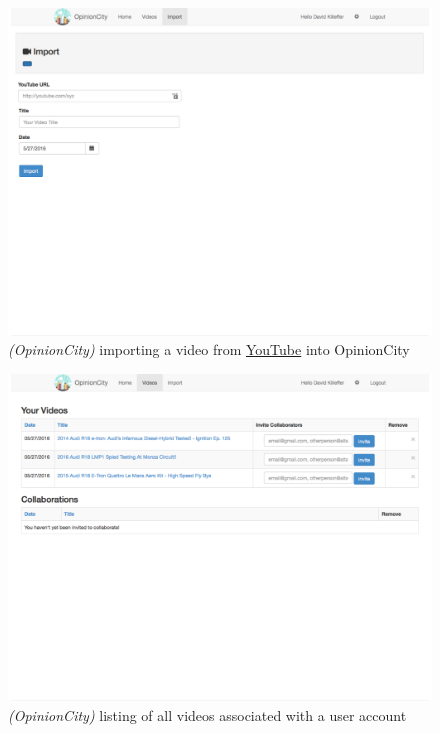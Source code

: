 \begin{figure}[!ht]
	\includegraphics[width=\textwidth]{gfx/opinion-city/import2.pdf}
	\caption{\textit{(OpinionCity)} importing a video from \href{http://www.youtube.com}{YouTube} into OpinionCity} 
	\label{fig:opinioncity:importing-a-video-from-youtube}
	\center{\noindent\rule{0.75\textwidth}{0.4pt}}
\end{figure}

\begin{figure}[!ht]
	\includegraphics[width=\textwidth]{gfx/opinion-city/videolist2.pdf}
	\caption{\textit{(OpinionCity)} listing of all videos associated with a user account} 
	\label{fig:opinioncity:video-listing}
	\center{\noindent\rule{0.75\textwidth}{0.4pt}}
\end{figure}

